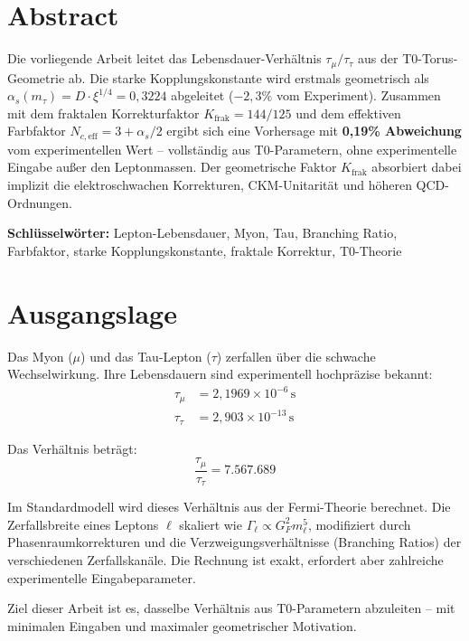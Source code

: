 
	\section*{Abstract}
	Die vorliegende Arbeit leitet das Lebensdauer-Verhältnis $\tau_\mu/\tau_\tau$ aus der T0-Torus-Geometrie ab. Die starke Kopplungskonstante wird erstmals geometrisch als $\alpha_s(m_\tau) = D \cdot \xi^{1/4} = 0{,}3224$ abgeleitet ($-2{,}3\%$ vom Experiment). Zusammen mit dem fraktalen Korrekturfaktor $K_\text{frak} = 144/125$ und dem effektiven Farbfaktor $N_{c,\text{eff}} = 3 + \alpha_s/2$ ergibt sich eine Vorhersage mit \textbf{0,19\% Abweichung} vom experimentellen Wert -- vollständig aus T0-Parametern, ohne experimentelle Eingabe außer den Leptonmassen. Der geometrische Faktor $K_\text{frak}$ absorbiert dabei implizit die elektroschwachen Korrekturen, CKM-Unitarität und höheren QCD-Ordnungen.
	
	\textbf{Schlüsselwörter:} Lepton-Lebensdauer, Myon, Tau, Branching Ratio, Farbfaktor, starke Kopplungskonstante, fraktale Korrektur, T0-Theorie
	
	
	\section{Ausgangslage}
	
	Das Myon ($\mu$) und das Tau-Lepton ($\tau$) zerfallen über die schwache Wechselwirkung. Ihre Lebensdauern sind experimentell hochpräzise bekannt:
	\begin{align}
		\tau_\mu &= 2{,}1969 \times 10^{-6} \, \text{s} \\
		\tau_\tau &= 2{,}903 \times 10^{-13} \, \text{s}
	\end{align}
	
	Das Verhältnis beträgt:
	\begin{equation}
		\frac{\tau_\mu}{\tau_\tau} = 7{.}567{.}689
	\end{equation}
	
	Im Standardmodell wird dieses Verhältnis aus der Fermi-Theorie berechnet. Die Zerfallsbreite eines Leptons $\ell$ skaliert wie $\Gamma_\ell \propto G_F^2 m_\ell^5$, modifiziert durch Phasenraumkorrekturen und die Verzweigungsverhältnisse (Branching Ratios) der verschiedenen Zerfallskanäle. Die Rechnung ist exakt, erfordert aber zahlreiche experimentelle Eingabeparameter.
	
	Ziel dieser Arbeit ist es, dasselbe Verhältnis aus T0-Parametern abzuleiten -- mit minimalen Eingaben und maximaler geometrischer Motivation.
	
